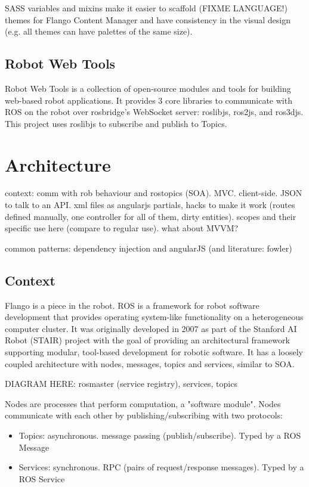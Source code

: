 SASS variables and mixins make it easier to scaffold (FIXME LANGUAGE!) themes for Flango Content Manager and have consistency in the visual design (e.g. all themes can have palettes of the same size).

\subsection{Robot Web Tools}
Robot Web Tools is a collection of open-source modules and tools for building web-based robot applications.
It provides 3 core libraries to communicate with \ac{ROS} on the robot over rosbridge's WebSocket server: roslibjs, ros2js, and ros3djs.
This project uses roslibjs to subscribe and publish to Topics.

\section{Architecture}
context: comm with rob behaviour and rostopics (SOA).
MVC. client-side. JSON to talk to an API. xml files as angularjs partials, hacks to make it work (routes defined manually, one controller for all of them, dirty entities). scopes and their specific use here (compare to regular use). what about MVVM?

common patterns:
dependency injection and angularJS (and literature: fowler)

\subsection{Context}
Flango \cm is a piece in the robot.
\ac{ROS} is a framework for robot software development that provides operating system-like functionality on a heterogeneous computer cluster. 
It was originally developed in 2007 as part of the Stanford AI Robot (STAIR) project with the goal of providing an architectural framework supporting modular, tool-based development for robotic software.
It has a loosely coupled architecture with nodes, messages, topics and services, similar to \ac{SOA}.

DIAGRAM HERE: rosmaster (service registry), services, topics

Nodes are processes that perform computation, a "software module". 
Nodes communicate with each other by publishing/subscribing with two protocols:
\begin{itemize}
\item Topics: asynchronous. message passing (publish/subscribe). Typed by a \ac{ROS} Message
\item Services: synchronous. \ac{RPC} (pairs of request/response messages). Typed by a \ac{ROS} Service
\end{itemize}

